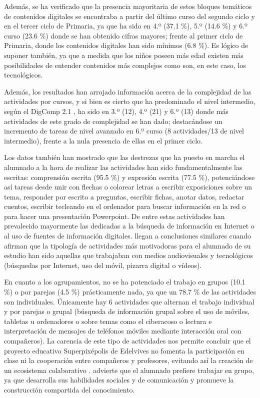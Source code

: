 \documentclass{textolivre}
\begin{document}
Además, se ha verificado que la presencia mayoritaria de estos bloques temáticos de contenidos digitales se encontraba a partir del último curso del segundo ciclo y en el tercer ciclo de Primaria, ya que ha sido en 4.º (37.1 \%), 5.º (14.6 \%) y 6.º curso (23.6 \%) donde se han obtenido cifras mayores; frente al primer ciclo de Primaria, donde los contenidos digitales han sido mínimos (6.8 \%). Es lógico de suponer también, ya que a medida que los niños poseen más edad existen más posibilidades de entender contenidos más complejos como son, en este caso, los tecnológicos. 

Además, los resultados han arrojado información acerca de la complejidad de las actividades por cursos, y si bien es cierto que ha predominado el nivel intermedio, según el DigComp 2.1 \cite{carretero_2018}, ha sido en 3.º (12), 4.º (21) y 6.º (13) donde más actividades de este grado de complejidad se han dado; destacándose un incremento de tareas de nivel avanzado en 6.º curso (8 actividades/13 de nivel intermedio), frente a la nula presencia de ellas en el primer ciclo. 

Los datos también han mostrado que las destrezas que ha puesto en marcha el alumnado a la hora de realizar las actividades han sido fundamentalmente las escritas: comprensión escrita (95.5 \%) y expresión escrita (77.5 \%), potenciándose así tareas desde unir con flechas o colorear letras a escribir exposiciones sobre un tema, responder por escrito a preguntas, escribir fichas, anotar datos, redactar cuentos, escribir tecleando en el ordenador para buscar información en la red o para hacer una presentación Powerpoint. De entre estas actividades han prevalecido mayormente las dedicadas a la búsqueda de información en Internet o al uso de fuentes de información digitales. \textcite{calcines_pinero_integracion_2016} llegan a conclusiones similares cuando afirman que la tipología de actividades más motivadoras para el alumnado de su estudio han sido aquellas que trabajaban con medios audiovisuales y tecnológicos (búsquedas por Internet, uso del móvil, pizarra digital o vídeos). 

En cuanto a los agrupamientos, no se ha potenciado el trabajo en grupos (10.1 \%) o por parejas (4.5 \%) prácticamente nada, ya que un 78.7 \% de las actividades son individuales. Únicamente hay 6 actividades que alternan el trabajo individual y por parejas o grupal (búsqueda de información grupal sobre el uso de móviles, tabletas u ordenadores o sobre temas como el ciberacoso o lectura e interpretación de mensajes de teléfonos móviles mediante interacción oral con compañeros). La carencia de este tipo de actividades nos permite concluir que el proyecto educativo Superpixépolis de Edelvives no fomenta la participación en clase ni la cooperación entre compañeros y profesores, evitando así la creación de un ecosistema colaborativo \cite{marin_diaz_universidad_2012}. \textcite{diaz_lazaro_social_2016} advierte que el alumnado prefiere trabajar en grupo, ya que desarrolla sus habilidades sociales y de comunicación y promueve la construcción compartida del conocimiento.  
\end{document}
